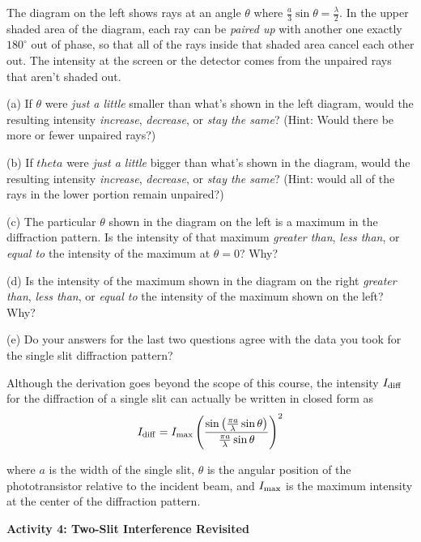 The diagram on the left shows rays at an angle $\theta$ where $\frac{a}{3} \sin \theta = \frac{\lambda}{2}$.  In the upper shaded area of the diagram, each ray can be \textit{paired up} with another one exactly $180^{\circ}$ out of phase, so that all of the rays inside that shaded area cancel each other out.  The intensity at the screen or the detector  comes from the unpaired rays that aren't shaded out.

(a) If $\theta$ were \textit{just a little} smaller than what's shown in the left diagram, would the resulting intensity \textit{increase}, \textit{decrease}, or \textit{stay the same}? (Hint: Would there be more or fewer unpaired rays?)
\answerspace{0.4in}

(b) If $theta$ were \textit{just a little} bigger than what's shown in the diagram, would the resulting intensity \textit{increase}, \textit{decrease}, or \textit{stay the same}?  (Hint: would all of the rays in the lower portion remain unpaired?)
\answerspace{0.4in}

(c) The particular $\theta$ shown in the diagram on the left is a maximum in the diffraction pattern.  Is the intensity of that maximum \textit{greater than}, \textit{less than}, or \textit{equal to} the intensity of the maximum at $\theta = 0$?  Why?
\answerspace{0.4in}

(d) Is the intensity of the maximum shown in the diagram on the right \textit{greater than}, \textit{less than}, or \textit{equal to} the intensity of the maximum shown on the left?  Why?  
\answerspace{0.4in}

(e) Do your answers for the last two questions agree with the data you took for the single slit diffraction pattern?
\answerspace{0.2in}


\pagebreak[2]
Although the derivation goes beyond the scope of this course, the intensity $I_{\rm{diff}}$ for the diffraction of a single slit can actually be written in closed form as
\begin{displaymath} 
I_{\rm{diff}} = I_{\rm{max}} \left( \frac {\sin \left(\frac {\pi a} {\lambda} \sin \theta \right)} {\frac {\pi a} {\lambda} \sin \theta} \right)^2 \end{displaymath}

where $a$ is the width of the single slit, \( \theta  \) is the angular
position of the phototransistor relative to the incident beam, and $I_{\rm{max}}$
is the maximum intensity at the center of the diffraction pattern.

\pagebreak[2]
\textbf{Activity 4: Two-Slit Interference Revisited}


